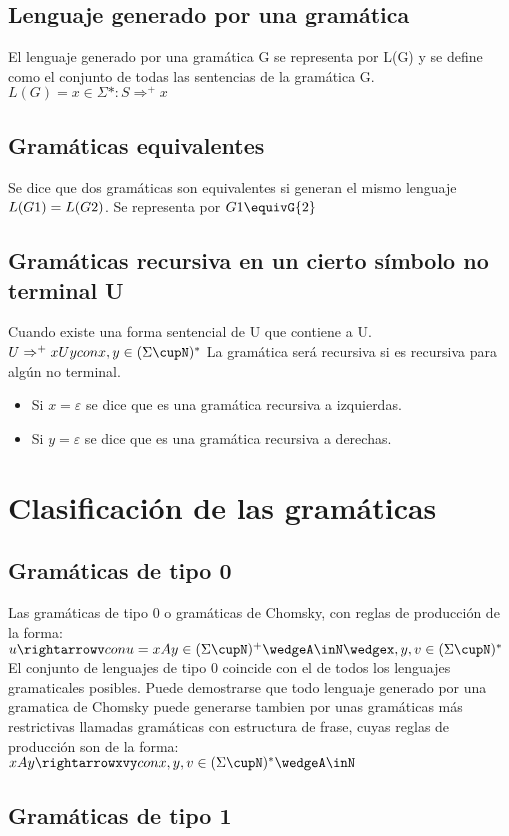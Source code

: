 \subsection{Lenguaje generado por una gramática}
El lenguaje generado por una gramática G se representa por L(G) y se define como el conjunto de todas las sentencias de la gramática G. 
$L(G)={x\in\Sigma*:S\Rightarrow ^{+} x}$
\subsection{Gramáticas equivalentes}
Se dice que dos gramáticas son equivalentes si generan el mismo lenguaje $L(G{\small 1})=L(G{\small 2})$.
Se representa por $G{\small 1}\equivG{\small 2}$
\subsection{Gramáticas recursiva en un cierto símbolo no terminal U}
Cuando existe una forma sentencial de U que contiene a U.
$U\Rightarrow^{+}xUy con x,y\in(\Sigma\cupN)^{*}$
La gramática será recursiva si es recursiva para algún no terminal.
\begin{itemize}
	\item Si $x=\varepsilon$ se dice que es una gramática recursiva a izquierdas.
	\item Si $y=\varepsilon$ se dice que es una gramática recursiva a derechas.
\end{itemize}



\section{Clasificación de las gramáticas}
\subsection{Gramáticas de tipo 0}

Las gramáticas de tipo 0 o gramáticas de Chomsky, con reglas de producción de la forma:
$u\rightarrowv con u=xAy \in (\Sigma\cupN)^{+}\wedgeA\inN\wedgex,y,v \in(\Sigma\cupN)^{*}$
El conjunto de lenguajes de tipo 0 coincide con el de todos los lenguajes gramaticales posibles.
Puede demostrarse que todo lenguaje generado por una gramatica de Chomsky puede generarse tambien por unas gramáticas más restrictivas llamadas gramáticas con estructura de frase, cuyas reglas de producción son de la forma:
$xAy \rightarrowxvy con x,y,v\in(\Sigma\cupN)^{*}\wedgeA\inN$
\subsection{Gramáticas de tipo 1}

